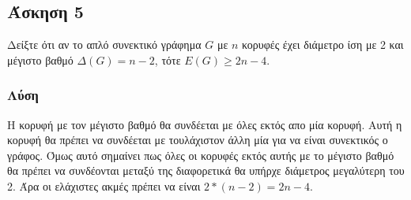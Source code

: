 \subsection*{Άσκηση 5}

Δείξτε ότι αν το απλό συνεκτικό γράφημα $G$ με $n$ κορυφές έχει διάμετρο ίση με 2 και μέγιστο βαθμό 
$\Delta(G)=n-2$, τότε $E(G) \ge 2n-4$.

\subsubsection*{Λύση}

Η κορυφή με τον μέγιστο βαθμό θα συνδέεται με όλες εκτός απο μία κορυφή. Αυτή η κορυφή θα πρέπει να συνδέεται με τουλάχιστον άλλη μία για να είναι
συνεκτικός ο γράφος. Όμως αυτό σημαίνει πως όλες οι κορυφές εκτός αυτής με το μέγιστο βαθμό θα πρέπει να συνδέονται μεταξύ της διαφορετικά θα υπήρχε 
διάμετρος μεγαλύτερη του 2. Άρα οι ελάχιστες ακμές πρέπει να είναι $2*(n-2) = 2n - 4$.
